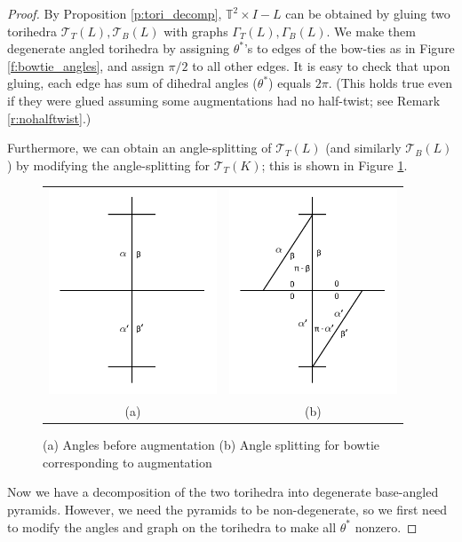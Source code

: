 \documentclass[11pt]{amsart}
\newcommand{\prpref}[1]{Proposition \ref{#1}}
\newcommand{\remref}[1]{Remark \ref{#1}}
\newcommand{\torus}{{\mathbb{T}^2}}
\newcommand{\sT}{{\mathcal{T}}}
\newcommand{\toruscomp}[1]{{\torus \times I - #1}}
\theoremstyle{plain}
\theoremstyle{definition}
\begin{document}
\begin{proof}
By \prpref{p:tori_decomp}, $\toruscomp{L}$ can be
obtained by gluing two torihedra $\sT_T(L),\sT_B(L)$
with graphs $\Gamma_T(L),\Gamma_B(L)$.
We make them degenerate angled torihedra by assigning $\theta^*$'s
to edges of the bow-ties as in Figure \ref{f:bowtie_angles},
and assign $\pi/2$ to all other edges.
It is easy to check that upon gluing,
each edge has sum of dihedral angles ($\theta^*$) equals $2\pi$.
(This holds true even if they were glued assuming
some augmentations had no half-twist; see \remref{r:nohalftwist}.)


Furthermore, we can obtain an angle-splitting of $\sT_T(L)$
(and similarly $\sT_B(L)$) by modifying the angle-splitting
for $\sT_T(K)$;
this is shown in Figure \ref{f:bowtie_angles2}.

\begin{figure}
\begin{tabular}{cc}
\includegraphics[width = 5cm]{before_bowtie_angles}&
\includegraphics[width = 5cm]{bowtie_angles}\\
(a)&(b)
\end{tabular}
\caption{(a) Angles before augmentation (b) Angle splitting for bowtie corresponding to augmentation}
\label{f:bowtie_angles2}
\end{figure}

Now we have a decomposition of the two torihedra into
degenerate base-angled pyramids.
However, we need the pyramids to be non-degenerate,
so we first need to modify the angles and graph on the torihedra
to make all $\theta^*$ nonzero.



\end{proof}
\end{document}
